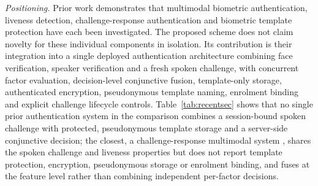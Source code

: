 \documentclass[10pt,journal,compsoc]{IEEEtran}
\begin{document}
{\emph{Positioning.} Prior work demonstrates that multimodal biometric authentication, liveness detection, challenge-response authentication and biometric template protection have each been investigated. The proposed scheme does not claim novelty for these individual components in isolation. Its contribution is their integration into a single deployed authentication architecture combining face verification, speaker verification and a fresh spoken challenge, with concurrent factor evaluation, decision-level conjunctive fusion, template-only storage, authenticated encryption, pseudonymous template naming, enrolment binding and explicit challenge lifecycle controls. Table~\ref{tab:recentsec} shows that no single prior authentication system in the comparison combines a session-bound spoken challenge with protected, pseudonymous template storage and a server-side conjunctive decision; the closest, a challenge-response multimodal system \cite{jha2025challenge}, shares the spoken challenge and liveness properties but does not report template protection, encryption, pseudonymous storage or enrolment binding, and fuses at the feature level rather than combining independent per-factor decisions.

}
\end{document}
